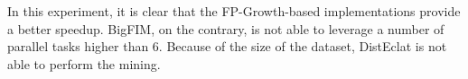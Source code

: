 In this experiment, it is clear that the FP-Growth-based implementations provide a better speedup. 
BigFIM, on the contrary, is not able to leverage a number of parallel tasks higher than 6.
Because of the size of the dataset, DistEclat is not able to perform the mining. 
%




